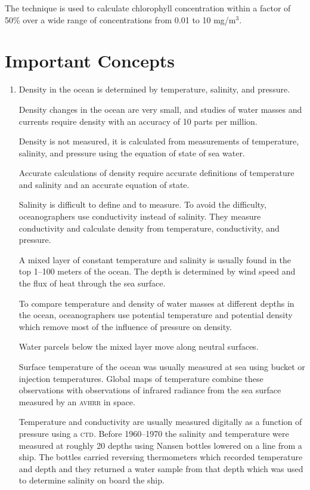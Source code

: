 The technique is used to calculate chlorophyll concentration within a
factor of 50\% over a wide range of concentrations from 0.01 to 10
mg/m$^3$.

\section{Important Concepts}
\begin{enumerate}
\item Density in the ocean is determined by temperature, salinity, and
pressure.

\vitem Density changes in the ocean are very small, and studies of
water masses and currents require density with an
accuracy of 10 parts per million.

\vitem Density is not measured, it is calculated from measurements of
temperature, salinity, and pressure using the equation of state of sea
water.

\vitem Accurate calculations of density require accurate definitions
of temperature and salinity and an accurate equation of state.

\vitem Salinity is difficult to define and to measure. To avoid the
difficulty, oceanographers use conductivity instead of salinity. They
measure conductivity and calculate density from temperature,
conductivity, and pressure.

\vitem A mixed layer of constant temperature and
salinity is usually found in the top 1--100 meters of the ocean. The
depth is determined by wind speed and the flux of heat through the sea
surface.

\vitem To compare temperature and density of water masses at different
depths in the ocean, oceanographers use potential temperature and
potential density which remove most of the influence of pressure on
density.

\vitem Water parcels below the mixed layer move
along neutral surfaces.

\vitem Surface temperature of the ocean was usually measured at sea
using bucket or injection temperatures. Global maps of temperature
combine these observations with observations of infrared radiance from
the sea surface measured by an \textsc{avhrr} in space.

\vitem Temperature and conductivity are usually measured digitally as
a function of pressure using a \textsc{ctd}. Before
1960--1970 the salinity and temperature were measured at roughly 20
depths using Nansen bottles lowered on a line from a ship. The bottles
carried reversing thermometers which
recorded temperature and depth and they returned a water sample from
that depth which was used to determine salinity on board the ship.


\end{enumerate}
